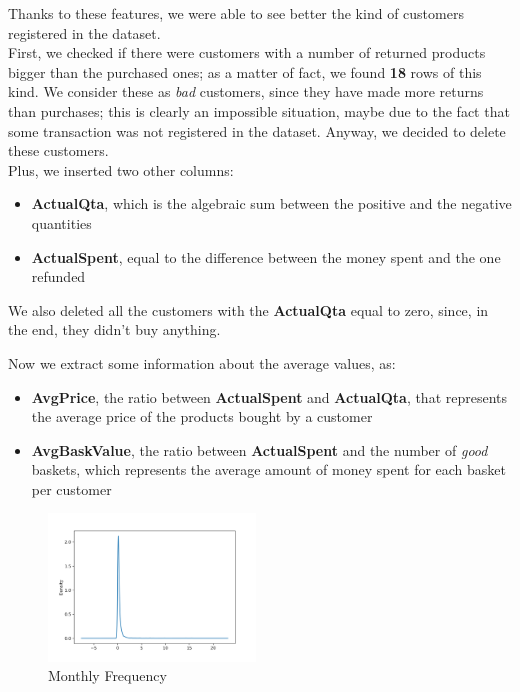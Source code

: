 Thanks to these features, we were able to see better the kind of customers registered in the dataset.\\
First, we checked if there were customers with a number of returned products bigger than the purchased ones; as a matter of fact, we found \textbf{18} rows of this kind. We consider these as \emph{bad} customers, since they have made more returns than purchases; this is clearly an impossible situation, maybe due to the fact that some transaction was not registered in the dataset.
Anyway, we decided to delete these customers.\\
Plus, we inserted two other columns:
\begin{itemize}
\item \textbf{ActualQta}, which is the algebraic sum between the positive and the negative quantities
\item \textbf{ActualSpent}, equal to the difference between the money spent and the one refunded
\end{itemize}

We also deleted all the customers with the \textbf{ActualQta} equal to zero, since, in the end, they didn't buy anything. 

Now we extract some information about the average values, as:
\begin{itemize}
\item \textbf{AvgPrice}, the ratio between \textbf{ActualSpent} and \textbf{ActualQta}, that represents the average price of the products bought by a customer
\item \textbf{AvgBaskValue}, the ratio between \textbf{ActualSpent} and the number of \emph{good} baskets, which represents the average amount of money spent for each basket per customer
\end{itemize}

\begin{figure}
\centering
\includegraphics[width=0.49\textwidth]{img/monthfreq.png}
\caption{Monthly Frequency}
\label{fig:month_freq}
\end{figure}

